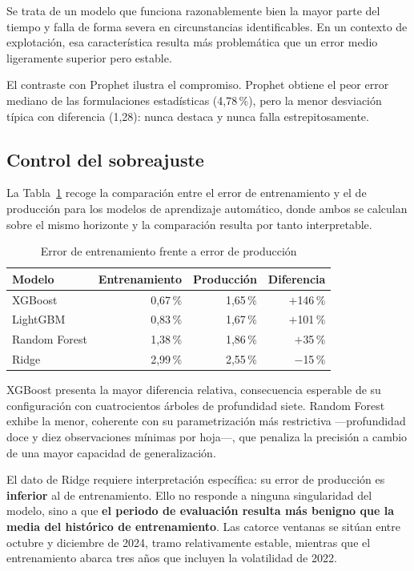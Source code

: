 Se trata de un modelo que funciona razonablemente bien la mayor parte del tiempo y
falla de forma severa en circunstancias identificables. En un contexto de
explotación, esa característica resulta más problemática que un error medio
ligeramente superior pero estable.

El contraste con Prophet ilustra el compromiso. Prophet obtiene el peor error
mediano de las formulaciones estadísticas (4,78\,\%), pero la menor desviación
típica con diferencia (1,28): nunca destaca y nunca falla estrepitosamente.

\subsection*{Control del sobreajuste}

La Tabla~\ref{tab:sobreajuste} recoge la comparación entre el error de
entrenamiento y el de producción para los modelos de aprendizaje automático, donde
ambos se calculan sobre el mismo horizonte y la comparación resulta por tanto
interpretable.

\begin{table}[H]
\centering
\caption{Error de entrenamiento frente a error de producción}
\label{tab:sobreajuste}
\begin{tabular}{|l|r|r|r|}
\hline
\rowcolor{grisclaro}
\textbf{Modelo} & \textbf{Entrenamiento} & \textbf{Producción} & \textbf{Diferencia} \\
\hline
XGBoost       & 0,67\,\% & 1,65\,\% & $+$146\,\% \\
\hline
LightGBM      & 0,83\,\% & 1,67\,\% & $+$101\,\% \\
\hline
Random Forest & 1,38\,\% & 1,86\,\% & $+$35\,\% \\
\hline
Ridge         & 2,99\,\% & 2,55\,\% & $-$15\,\% \\
\hline
\end{tabular}
\end{table}

XGBoost presenta la mayor diferencia relativa, consecuencia esperable de su
configuración con cuatrocientos árboles de profundidad siete. Random Forest exhibe
la menor, coherente con su parametrización más restrictiva —profundidad doce y
diez observaciones mínimas por hoja—, que penaliza la precisión a cambio de una
mayor capacidad de generalización.

El dato de Ridge requiere interpretación específica: su error de producción es
\textbf{inferior} al de entrenamiento. Ello no responde a ninguna singularidad del
modelo, sino a que \textbf{el periodo de evaluación resulta más benigno que la
media del histórico de entrenamiento}. Las catorce ventanas se sitúan entre
octubre y diciembre de 2024, tramo relativamente estable, mientras que el
entrenamiento abarca tres años que incluyen la volatilidad de 2022.

